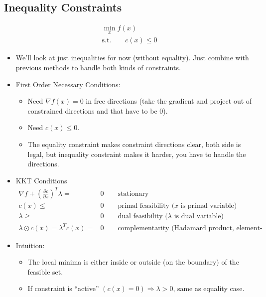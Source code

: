 \subsection{Inequality Constraints}
\begin{equation}
    \begin{aligned}
        \min_x f(x) \\
        \text{s.t.} \qquad c(x) \le 0
    \end{aligned}
\end{equation}
\begin{itemize}
    \item We'll look at just inequalities for now (without equality). Just combine with previous methods to handle both kinds of constraints.
    \item First Order Necessary Conditions:
    \begin{itemize}
        \item Need $\nabla f(x) = 0$ in free directions (take the gradient and project out of constrained directions and that have to be 0).
        \item Need $c(x)\le 0$.
        \item[*] The equality constraint makes constraint directions clear, both side is legal, but inequality constraint makes it harder, you have to handle the directions.
    \end{itemize}
    \item KKT Conditions
    \begin{equation}
        \begin{aligned}
            \nabla f+\left(\frac{\partial c}{\partial x}\right)^T\lambda=&0 \qquad \text{stationary}\\
            c(x)\le&0 \qquad \text{primal feasibility ($x$ is primal variable)} \\
            \lambda \ge&0 \qquad \text{dual feasibility ($\lambda$ is dual variable)} \\
            \lambda \odot  c(x) = \lambda^T c(x)=&0 \qquad \text{complementarity (Hadamard product, element-wise product)}
        \end{aligned}
    \end{equation}
    \item Intuition:
    \begin{itemize}
        \item The local minima is either inside or outside (on the boundary) of the feasible set.
        \item If constraint is ``active'' $\left(c(x) = 0\right)\Rightarrow\lambda>0$, same as equality case.

\end{itemize}
\end{itemize}
